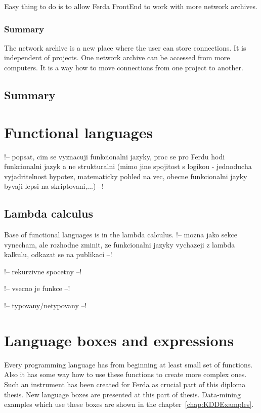 \documentclass[a4paper,12pt]{book}
\begin{document}
Easy thing to do is to allow Ferda FrontEnd to work with more network archives.

\subsubsection{Summary}
The network archive is a new place where the user can store connections. It is independent of projects. One network archive can be accessed from more computers. It is a way how to move connections from one project to another.

\subsection{Summary}

\section{Functional languages}
!-- popsat, cim se vyznacuji funkcionalni jazyky, proc se pro Ferdu hodi funkcionalni jazyk a ne strukturalni (mimo jine spojitost s logikou - jednoducha vyjadritelnost hypotez, matematicky pohled na vec, obecne funkcionalni jayky byvaji lepsi na skriptovani,...) --!

\subsection{Lambda calculus}
Base of functional languages is in the lambda calculus. 
!-- mozna jako sekce vynecham, ale rozhodne zminit, ze funkcionalni jazyky vychazeji z lambda kalkulu, odkazat se na publikaci --!

!-- rekurzivne spocetny --!

!-- vsecno je funkce --!

!-- typovany/netypovany --!

\section{Language boxes and expressions}
Every programming language has from beginning at least small set of functions. Also it has some way how to use these functions to create more complex ones. Such an instrument has been created for Ferda as crucial part of this diploma thesis. New language boxes are presented at this part of thesis. Data-mining examples which use these boxes are shown in the chapter~\ref{chap:KDDExamples}.
\end{document}

